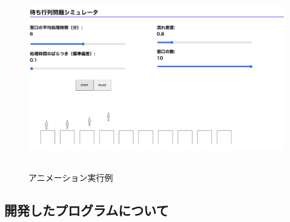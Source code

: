 \documentclass[12pt,a4j]{ltjsarticle}
\begin{document}
\begin{figure}[h]
\begin{center}
\includegraphics[height = 80mm ] {figures/lay_anime.pdf}
\caption{アニメーション実行例}
\label{fig:アニメ実行}
\end{center}
\end{figure}

\clearpage

\subsection{開発したプログラムについて}
\end{document}
